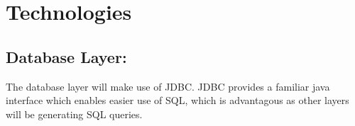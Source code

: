 \documentclass[11pt]{article}
\begin{document}
\section{Technologies}
\subsection{Database Layer:}
	The database layer will make use of JDBC. JDBC provides a familiar java interface which enables easier use of SQL, which is advantagous as other layers will be generating SQL queries.
\end{document}
